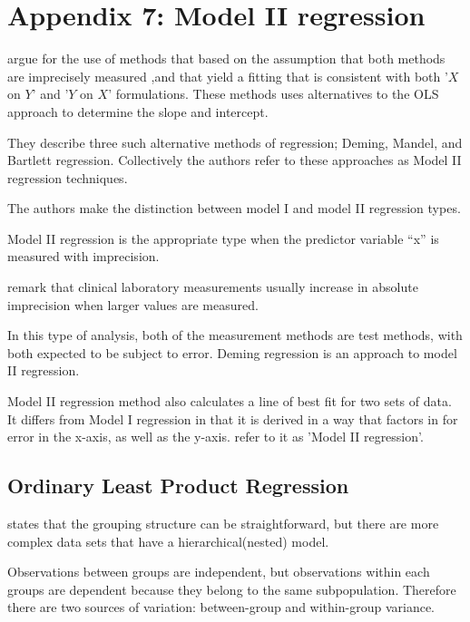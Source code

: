 \documentclass[12pt, a4paper]{report}
\theoremstyle{plain}
\theoremstyle{definition}
\theoremstyle{remark}
\begin{document}
		
		
\section{Appendix 7: Model II regression}
\citet{CornCoch} argue for the use of methods that based on
the assumption that both methods are imprecisely measured ,and
that yield a fitting that is consistent with both '$X$ on $Y$' and
'$Y$ on $X$' formulations. These methods uses alternatives to the
OLS approach to determine the slope and intercept.

They describe three such alternative methods of regression; Deming, Mandel, and Bartlett regression. Collectively the authors refer to these approaches as Model II regression techniques.

The authors make the distinction between model I and model II regression types.

Model II regression is the appropriate type when the predictor variable “x” is measured with imprecision.

\citet{CornCoch} remark that clinical laboratory measurements usually increase in absolute imprecision when larger values are measured.


In this type of analysis, both of the measurement methods are test methods, with both expected to be subject to error. Deming regression is an approach to model II regression.

Model II regression method also calculates a line of best fit for two sets of data. It differs from Model I regression in that it is derived in a way that factors in for error in the x-axis, as well as the y-axis. \citet{CornCoch} refer to it as 'Model II regression'.		
		
		
\subsection{Ordinary Least Product Regression}
		\citet{ludbrook97} states that the grouping structure can be
		straightforward, but there are more complex data sets that have a hierarchical(nested) model.
		
Observations between groups are independent, but observations
		within each groups are dependent because they belong to the same
		subpopulation. Therefore there are two sources of variation:
		between-group and within-group variance.
\end{document}
